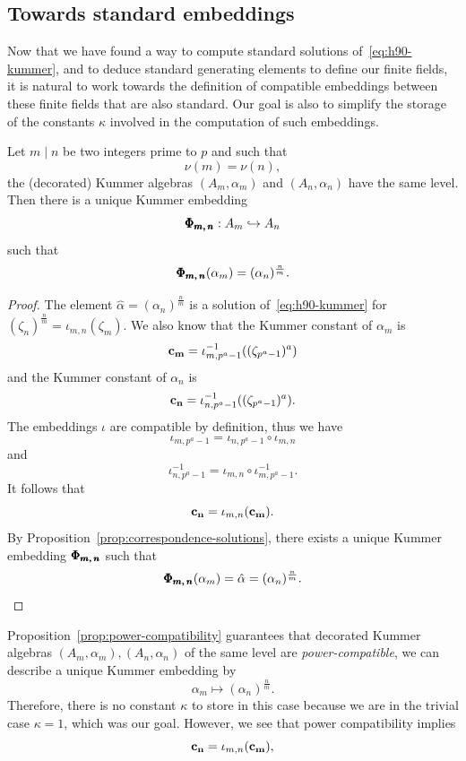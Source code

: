 \subsection{Towards standard embeddings}
\label{sec:towards-standard-embeddings}

Now that we have found a way to compute standard solutions
of~\eqref{eq:h90-kummer}, and to deduce standard generating elements to define
our finite fields, it is natural to work towards the definition of compatible
embeddings between these finite fields that are also standard. Our goal is also
to simplify the storage of the constants $\kappa$ involved in the computation of
such embeddings.
\begin{prop}
  \label{prop:power-compatibility}
  Let $m\mid n$ be two integers prime to $p$ and such that 
  \[
    \nu(m) = \nu(n),
  \]
  \ie the (decorated) Kummer algebras $(A_m, \alpha_m)$ and $(A_n, \alpha_n)$
  have the same level. Then there is a unique Kummer embedding
  \[
    \pmb{\Phi_{{m},\,{n}}}:A_m\hookrightarrow A_n
  \]
  such that
  \[
    \pmb{\Phi_{{m},\,{n}}}(\alpha_m) = (\alpha_n)^{\frac{n}{m}}.
  \]
\end{prop}
\begin{proof}
  The element $\hat\alpha = (\alpha_n)^{\frac{n}{m}}$ is a solution
  of~\eqref{eq:h90-kummer} for $(\zeta_n)^{\frac{n}{m}}=\iota_{m, n}(\zeta_m)$.
  We also know that the Kummer constant of $\alpha_m$ is
  \[
    \mathbf{c_{m}} = \iota_{m, p^a-1}^{-1}((\zeta_{p^a-1})^a)
  \]
  and the Kummer constant of $\alpha_n$ is 
  \[
    \mathbf{c_{n}} = \iota_{n, p^a-1}^{-1}((\zeta_{p^a-1})^a).
  \]
  The embeddings $\iota$ are compatible by definition, thus we have
  \[
    \iota_{m, p^a-1} = \iota_{n, p^a-1}\circ\iota_{m, n}
  \]
  and
  \[
    \iota_{n, p^a-1}^{-1} = \iota_{m, n}\circ\iota_{m, p^a-1}^{-1}.
  \]
  It follows that
  \[
    \mathbf{c_{n}} = \iota_{m, n}(\mathbf{c_{m}}).
  \]
  By Proposition~\ref{prop:correspondence-solutions}, there exists a unique
  Kummer embedding $\pmb{\Phi_{{m},\,{n}}}$ such that
  \[
    \pmb{\Phi_{{m},\,{n}}}(\alpha_m) = \hat\alpha = (\alpha_n)^{\frac{n}{m}}.
  \]
\end{proof}
Proposition~\ref{prop:power-compatibility} guarantees that decorated Kummer
algebras $(A_m, \alpha_m), (A_n, \alpha_n)$ of the same level are
\emph{power-compatible}, \ie we can describe a unique Kummer embedding by
\[
  \alpha_m\mapsto (\alpha_n)^{\frac{n}{m}}.
\]
Therefore, there is no constant $\kappa$ to store in this case because we are in
the trivial case $\kappa=1$, which was our
goal. However, we see that power compatibility implies
\[
  \mathbf{c_{n}} = \iota_{m, n}(\mathbf{c_{m}}),
\]
